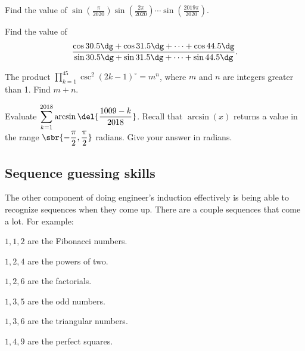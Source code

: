 \documentclass[11pt,paper=letter]{scrartcl}
\begin{document}
\begin{mdframed}[style=exmdbox]

\begin{problem}
Find the value of $\displaystyle \sin\left(\frac{\pi}{2020}\right)\sin\left(\frac{2\pi}{2020}\right)\cdots\sin\left(\frac{2019\pi}{2020}\right)$.
\end{problem}

\begin{problem}
Find the value of \[\dfrac{\cos 30.5\dg + \cos 31.5\dg + \cdots + \cos 44.5\dg}{\sin 30.5\dg + \sin 31.5\dg + \cdots + \sin 44.5\dg}.\]
\end{problem}

\begin{problem}[AIME I 2015/13]
The product $\displaystyle \prod_{k=1}^{45} \csc^2(2k-1)^\circ=m^n$, where $m$ and $n$ are integers greater than 1. Find $m+n$.
\end{problem}

\begin{problem}
Evaluate $\displaystyle \sum_{k=1}^{2018} \arcsin\del{\dfrac{1009-k}{2018}}$. Recall that $\arcsin(x)$ returns a value in the range $\sbr{-\dfrac\pi2, \dfrac\pi2}$ radians. Give your answer in radians.
\end{problem}


\end{mdframed}

\subsection{Sequence guessing skills}
\label{sec:sequenceguess}

The other component of doing engineer's induction effectively is being able to recognize sequences when they come up. There are a couple sequences that come a lot.  For example:

\begin{itemthin}
  \item $1, 1, 2$ are the Fibonacci numbers.
  \item $1, 2, 4$ are the powers of two.
  \item $1, 2, 6$ are the factorials.
  \item $1, 3, 5$ are the odd numbers.
  \item $1, 3, 6$ are the triangular numbers.
  \item $1, 4, 9$ are the perfect squares.
\end{itemthin}
\end{document}
